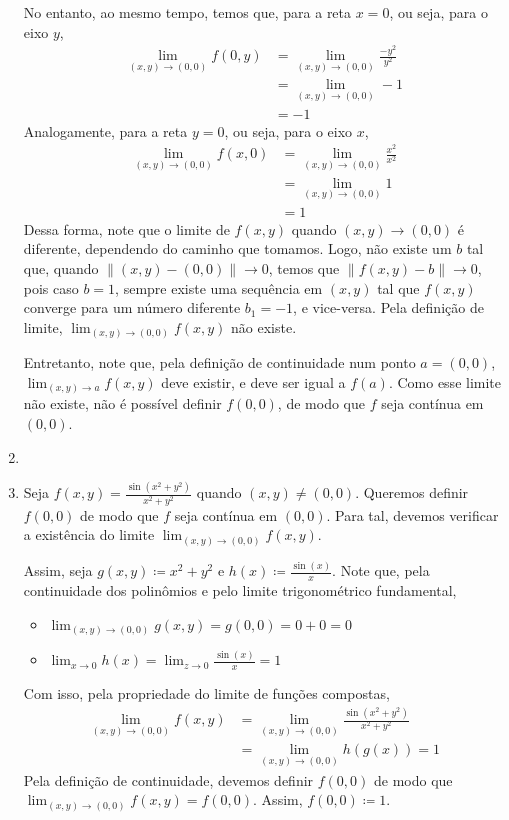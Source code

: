 \documentclass[../main.tex]{subfiles}
\begin{document}
\begin{solucao}
\begin{enumerate}[label=\alph*)]
				No entanto, ao mesmo tempo, temos que, para a reta $x=0$, ou seja, para o eixo $y$,
				\begin{align*}
					\lim_{(x,y)\to (0,0)} f(0,y) 
					&=\lim_{(x,y)\to (0,0)} \frac{-y^2}{y^2}\\
					&=\lim_{(x,y)\to (0,0)} -1\\
					&=-1
				\end{align*}
				Analogamente, para a reta $y=0$, ou seja, para o eixo $x$,
				\begin{align*}
					\lim_{(x,y)\to (0,0)} f(x,0)
					&=\lim_{(x,y)\to (0,0)} \frac{x^2}{x^2}\\
					&=\lim_{(x,y)\to (0,0)}1\\
					&=1
				\end{align*}
				Dessa forma, note que o limite de $f(x,y)$ quando $(x,y)\to (0,0)$ é diferente, dependendo do caminho que tomamos. Logo, não existe um $b$ tal que, quando $\|(x,y)-(0,0)\|\to 0$, temos que $\|f(x,y)-b\|\to 0$, pois caso $b=1$, sempre existe uma sequência em $(x,y)$ tal que $f(x,y)$ converge para um número diferente $b_1=-1$, e vice-versa. Pela definição de limite, $\lim_{(x,y)\to (0,0)} f(x,y)$ não existe.
				
				Entretanto, note que, pela definição de continuidade num ponto $a=(0,0)$, $\lim_{(x,y)\to a} f(x,y)$ deve existir, e deve ser igual a $f(a)$. Como esse limite não existe, não é possível definir $f(0,0)$, de modo que $f$ seja contínua em $(0,0)$.
				\item
				\item Seja $f(x,y)=\tfrac{\sin(x^2+y^2)}{x^2+y^2}$ quando $(x,y)\neq (0,0)$. Queremos definir $f(0,0)$ de modo que $f$ seja contínua em $(0,0)$. Para tal, devemos verificar a existência do limite $\lim_{(x,y)\to (0,0)} f(x,y)$.
				
				Assim, seja $g(x,y)\coloneq x^2+y^2$ e $h(x)\coloneq \tfrac{\sin(x)}{x}$. Note que, pela continuidade dos polinômios e pelo limite trigonométrico fundamental,
				\begin{itemize}
					\item $\lim_{(x,y)\to (0,0)} g(x,y)=g(0,0)=0+0=0$
					\item $\lim_{x\to 0} h(x)=\lim_{z\to 0} \frac{\sin(x)}{x}=1$
				\end{itemize}
				Com isso, pela propriedade do limite de funções compostas,
				\begin{align*}
					\lim_{(x,y)\to (0,0)} f(x,y)
						&=\lim_{(x,y)\to (0,0)} \tfrac{\sin(x^2+y^2)}{x^2+y^2}\\
						&=\lim_{(x,y)\to (0,0)}h(g(x))=1
				\end{align*}
				Pela definição de continuidade, devemos definir $f(0,0)$ de modo que $\lim_{(x,y)\to (0,0)}f(x,y)=f(0,0)$. Assim, $f(0,0)\coloneq 1$.
			\end{enumerate}
		\end{solucao}
\end{document}
